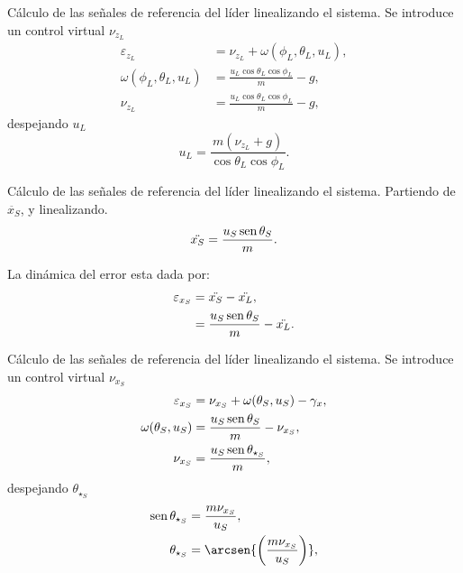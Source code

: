 \documentclass[hyperref={pdfpagelabels=false}]{beamer}
\begin{document}
\begin{frame}{Cálculo de las señales de referencia del l\'ider linealizando el sistema.} 
	Se introduce un control virtual $\nu_{z_L}$
	\begin{equation}
		\begin{split}
			\varepsilon_{z_L} &= \nu_{z_L} + \omega(\phi_L,\theta_L,u_L),\\
			\omega(\phi_L,\theta_L,u_L) &= \frac{u_L \cos{\theta_L}\cos{\phi_L}}{m}-g,\\
			\nu_{z_L} &= \frac{u_L \cos{\theta_L}\cos{\phi_L}}{m}-g,
		\end{split}
	\end{equation}
	despejando $u_L$
	\begin{equation}
			u_L = \frac{m (\nu_{z_L}+g)}{\cos{\theta_L}\cos{\phi_L}}.
	\end{equation}
\end{frame}




\begin{frame}{Cálculo de las señales de referencia del l\'ider linealizando el sistema.} 
	Partiendo de $\ddot{x_S}$, y linealizando.
	\begin{equation}
		\ddot{x_S} = \frac{u_S \operatorname{sen}{\theta_S}}{m}.
	\end{equation}
	
	La dinámica del error esta dada por: 
	\begin{equation}
		\begin{split}
			\varepsilon_{x_S} &= \ddot{x_S} - \ddot{x_L},\\
			&= \frac{u_S \operatorname{sen}{\theta_S}}{m} - \ddot{x_L}.
		\end{split}	
	\end{equation}
\end{frame}

%
\begin{frame}{Cálculo de las señales de referencia del l\'ider linealizando el sistema.} 
	Se introduce un control virtual $\nu_{x_S}$
	\begin{equation}
		\begin{split}
			\varepsilon_{x_S} &= \nu_{x_S} + \omega(\theta_S,u_S)- \gamma_x,\\
			\omega(\theta_S,u_S) &= \frac{u_S \operatorname{sen}{\theta_S}}{m} - \nu_{x_S},\\
			\nu_{x_S} &= \frac{u_S \operatorname{sen}{\theta_{\star_S}}}{m},
		\end{split}
	\end{equation}
	despejando $\theta_{\star_S}$
	\begin{equation}
		\begin{split}
			\sen{\theta_{\star_S}} &= \frac{m \nu_{x_S}}{u_S},\\
			\theta_{\star_S} &= \arcsen{\bigg(\frac{m \nu_{x_S}}{u_S}\bigg)},\\
		\end{split}
	\end{equation}
\end{frame}
\end{document}
